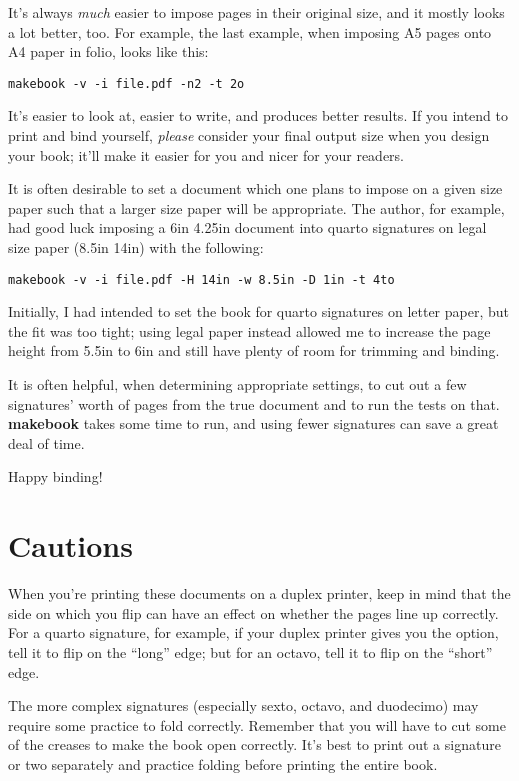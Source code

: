 \documentclass[12pt,twoside,final]{extarticle}
\begin{document}
It's always \emph{much} easier to impose pages in their original size, and it mostly looks  a lot better, too. For example, the last example, when imposing A5 pages onto A4 paper in folio, looks like this:

{\scriptsize
\begin{verbatim}
makebook -v -i file.pdf -n2 -t 2o
\end{verbatim}
}
%
It's easier to look at, easier to write, and produces better results. If you intend to print and bind yourself, \emph{please} consider your final output size when you design your book; it'll make it easier for you and nicer for your readers.

It is often desirable to set a document which one plans to impose on a given size paper such that a larger size paper will be appropriate. The author, for example, had good luck imposing a 6in {\selectfont{}} 4.25in document into quarto signatures on legal size paper (8.5in {\selectfont{}} 14in) with the following:

{\scriptsize
\begin{verbatim}
makebook -v -i file.pdf -H 14in -w 8.5in -D 1in -t 4to
\end{verbatim}
}
%
Initially, I had intended to set the book for quarto signatures on letter paper, but the fit was too tight; using legal paper instead allowed me to increase the page height from 5.5in to 6in and still have plenty of room for trimming and binding.

It is often helpful, when determining appropriate settings, to cut out a few signatures' worth of pages from the true document and to run the tests on that.  \textbf{makebook} takes some time to run, and using fewer signatures can save a great deal of time.

Happy binding!
\section{Cautions}
When you're printing these documents on a duplex printer, keep in mind that the side on which you flip can have an effect on whether the pages line up correctly. For a quarto signature, for example, if your duplex  printer gives you the  option, tell  it to flip on the ``long'' edge; but for an octavo, tell it to flip on the ``short'' edge.

The more complex signatures (especially sexto, octavo, and duodecimo) may require some practice to fold correctly. Remember that you will have to cut some of the creases to make the book open correctly. It's best to print out a signature or two separately and practice folding before printing the entire book.
\end{document}
